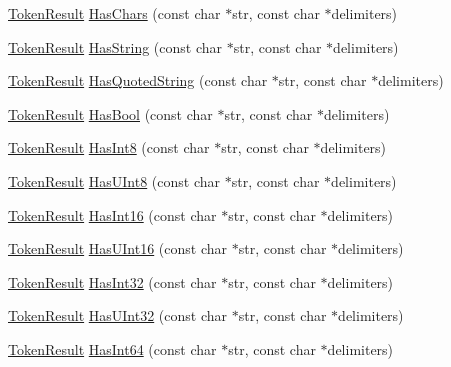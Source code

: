 \begin{DoxyCompactItemize}
\item 
\hyperlink{namespacemage_a2178ba2411db5912f41b2e7698c2037d}{Token\+Result} \hyperlink{namespacemage_a0b670c167bd464cfcb96ff4238e12f76}{Has\+Chars} (const char $\ast$str, const char $\ast$delimiters)
\item 
\hyperlink{namespacemage_a2178ba2411db5912f41b2e7698c2037d}{Token\+Result} \hyperlink{namespacemage_aee4453ab304c7abc50f3b6f8ff53ce19}{Has\+String} (const char $\ast$str, const char $\ast$delimiters)
\item 
\hyperlink{namespacemage_a2178ba2411db5912f41b2e7698c2037d}{Token\+Result} \hyperlink{namespacemage_aae5d7c6c8ff6dcd039a3c5afaafeb241}{Has\+Quoted\+String} (const char $\ast$str, const char $\ast$delimiters)
\item 
\hyperlink{namespacemage_a2178ba2411db5912f41b2e7698c2037d}{Token\+Result} \hyperlink{namespacemage_ab8d3a7642225fabd1e78f0e1fc49f1fe}{Has\+Bool} (const char $\ast$str, const char $\ast$delimiters)
\item 
\hyperlink{namespacemage_a2178ba2411db5912f41b2e7698c2037d}{Token\+Result} \hyperlink{namespacemage_aeb74d3691c0033e4df9a4dd3aec28f14}{Has\+Int8} (const char $\ast$str, const char $\ast$delimiters)
\item 
\hyperlink{namespacemage_a2178ba2411db5912f41b2e7698c2037d}{Token\+Result} \hyperlink{namespacemage_ad4371436b14bc05f22abde780bf07be5}{Has\+U\+Int8} (const char $\ast$str, const char $\ast$delimiters)
\item 
\hyperlink{namespacemage_a2178ba2411db5912f41b2e7698c2037d}{Token\+Result} \hyperlink{namespacemage_acb619a437a47ef3212c2fc71fdfa33b6}{Has\+Int16} (const char $\ast$str, const char $\ast$delimiters)
\item 
\hyperlink{namespacemage_a2178ba2411db5912f41b2e7698c2037d}{Token\+Result} \hyperlink{namespacemage_a1dd9c4b40b7b0e084a3014f8fd9f26ca}{Has\+U\+Int16} (const char $\ast$str, const char $\ast$delimiters)
\item 
\hyperlink{namespacemage_a2178ba2411db5912f41b2e7698c2037d}{Token\+Result} \hyperlink{namespacemage_a78f76aec12a47505136e00224e4bf9ce}{Has\+Int32} (const char $\ast$str, const char $\ast$delimiters)
\item 
\hyperlink{namespacemage_a2178ba2411db5912f41b2e7698c2037d}{Token\+Result} \hyperlink{namespacemage_a2b7625293b098b935d6fe3b251573018}{Has\+U\+Int32} (const char $\ast$str, const char $\ast$delimiters)
\item 
\hyperlink{namespacemage_a2178ba2411db5912f41b2e7698c2037d}{Token\+Result} \hyperlink{namespacemage_a59d8d6302b2f0cd017dfa2217ac536b0}{Has\+Int64} (const char $\ast$str, const char $\ast$delimiters)

\end{DoxyCompactItemize}
